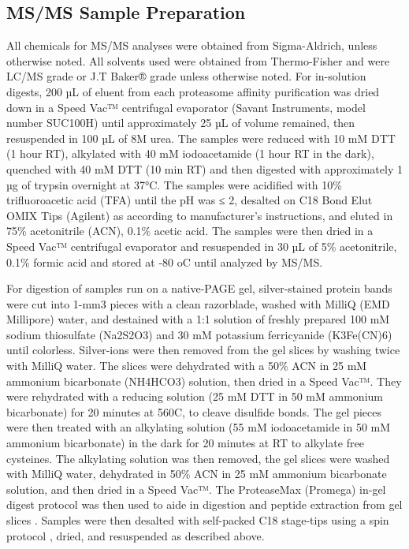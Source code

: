 \subsection{MS/MS Sample Preparation}
	All chemicals for MS/MS analyses were obtained from Sigma-Aldrich, unless otherwise noted. All solvents used were obtained from Thermo-Fisher and were LC/MS grade or J.T Baker® grade unless otherwise noted. For in-solution digests, 200 µL of eluent from each proteasome affinity purification was dried down in a Speed Vac™ centrifugal evaporator (Savant Instruments, model number SUC100H) until approximately 25 µL of volume remained, then resuspended in 100 µL of 8M urea. The samples were reduced with 10 mM DTT (1 hour RT), alkylated with 40 mM iodoacetamide (1 hour RT in the dark), quenched with 40 mM DTT (10 min RT) and then digested with approximately 1 µg of trypsin overnight at 37°C. The samples were acidified with 10\% trifluoroacetic acid (TFA) until the pH was ≤ 2, desalted on C18 Bond Elut OMIX Tips (Agilent) as according to manufacturer’s instructions, and eluted in 75\% acetonitrile (ACN), 0.1\% acetic acid. The samples were then dried in a Speed Vac™ centrifugal evaporator and resuspended in 30 µL of 5\% acetonitrile, 0.1\% formic acid and stored at -80 oC until analyzed by MS/MS. 
	
	For digestion of samples run on a native-PAGE gel, silver-stained protein bands were cut into 1-mm3 pieces with a clean razorblade, washed with MilliQ (EMD Millipore) water, and destained with a 1:1 solution of freshly prepared 100 mM sodium thiosulfate (Na2S2O3) and 30 mM potassium ferricyanide (K3Fe(CN)6) until colorless. Silver-ions were then removed from the gel slices by washing twice with MilliQ water. The slices were dehydrated with a 50\% ACN in 25 mM ammonium bicarbonate (NH4HCO3) solution, then dried in a Speed Vac™. They were rehydrated with a reducing solution (25 mM DTT in 50 mM ammonium bicarbonate) for 20 minutes at 560C, to cleave disulfide bonds. The gel pieces were then treated with an alkylating solution (55 mM iodoacetamide in 50 mM ammonium bicarbonate) in the dark for 20 minutes at RT to alkylate free cysteines. The alkylating solution was then removed, the gel slices were washed with MilliQ water, dehydrated in 50\% ACN in 25 mM ammonium bicarbonate solution, and then dried in a Speed Vac™. The ProteaseMax (Promega) in-gel digest protocol was then used to aide in digestion and peptide extraction from gel slices \citep{saveliev13}. Samples were then desalted with self-packed C18 stage-tips \citep{rappsilber03} using a spin protocol \citep{yu14} , dried, and resuspended as described above.

